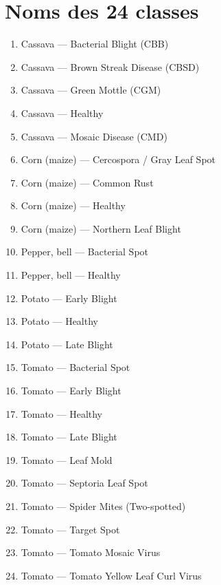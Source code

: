 \documentclass[12pt, a4paper, twoside]{report}
\begin{document}
\chapter{Noms des 24 classes}
\label{app:classnames}

\begin{enumerate}[noitemsep]
    \item Cassava --- Bacterial Blight (CBB)
    \item Cassava --- Brown Streak Disease (CBSD)
    \item Cassava --- Green Mottle (CGM)
    \item Cassava --- Healthy
    \item Cassava --- Mosaic Disease (CMD)
    \item Corn (maize) --- Cercospora / Gray Leaf Spot
    \item Corn (maize) --- Common Rust
    \item Corn (maize) --- Healthy
    \item Corn (maize) --- Northern Leaf Blight
    \item Pepper, bell --- Bacterial Spot
    \item Pepper, bell --- Healthy
    \item Potato --- Early Blight
    \item Potato --- Healthy
    \item Potato --- Late Blight
    \item Tomato --- Bacterial Spot
    \item Tomato --- Early Blight
    \item Tomato --- Healthy
    \item Tomato --- Late Blight
    \item Tomato --- Leaf Mold
    \item Tomato --- Septoria Leaf Spot
    \item Tomato --- Spider Mites (Two-spotted)
    \item Tomato --- Target Spot
    \item Tomato --- Tomato Mosaic Virus
    \item Tomato --- Tomato Yellow Leaf Curl Virus
\end{enumerate}
\end{document}
